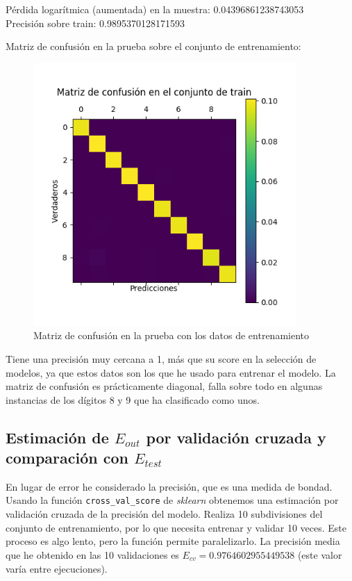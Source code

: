 \documentclass[a4]{article}
\begin{document}
Pérdida logarítmica (aumentada) en la muestra: 0.04396861238743053 \\
Precisión sobre train: 0.9895370128171593

Matriz de confusión en la prueba sobre el conjunto de entrenamiento:
\vspace{-4mm}
\begin{figure}[H]
  \centering
  \includegraphics[width=100mm]{imgs/conf-train.png}
  \caption{Matriz de confusión en la prueba con los datos de
    entrenamiento}
  \label{fig:conf-train}
\end{figure}
\vspace{-4mm}

Tiene una precisión muy cercana a 1, más que su score en la selección
de modelos, ya que estos datos son los que he usado para entrenar el
modelo. La matriz de confusión es prácticamente diagonal, falla sobre
todo en algunas instancias de los dígitos 8 y 9 que ha clasificado
como unos.

\subsection{Estimación de $E_{out}$ por validación cruzada y
  comparación con $E_{test}$}

En lugar de error he considerado la precisión, que es una medida de
bondad. Usando la función \texttt{cross\_val\_score} de
\textit{sklearn} obtenemos una estimación por validación cruzada de la
precisión del modelo. Realiza 10 subdivisiones del conjunto de
entrenamiento, por lo que necesita entrenar y validar 10 veces. Este
proceso es algo lento, pero la función permite paralelizarlo. La
precisión media que he obtenido en las 10 validaciones es
$E_{cv} = 0.9764602955449538$ (este valor varía entre ejecuciones).
\end{document}
